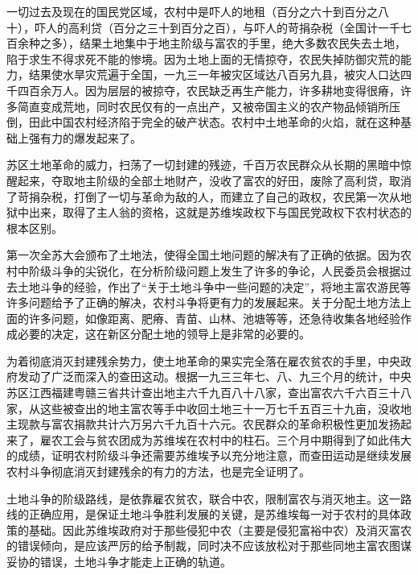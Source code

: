 一切过去及现在的国民党区域，农村中是吓人的地租（百分之六十到百分之八十），吓人的高利贷（百分之三十到百分之百），与吓人的苛捐杂税（全国计一千七百余种之多），结果土地集中于地主阶级与富农的手里，绝大多数农民失去土地，陷于求生不得求死不能的惨境。因为土地上面的无情掠夺，农民失掉防御灾荒的能力，结果使水旱灾荒遍于全国，一九三一年被灾区域达八百另九县，被灾人口达四千四百余万人。因为层层的被掠夺，农民缺乏再生产能力，许多耕地变得很瘠，许多简直变成荒地，同时农民仅有的一点出产，又被帝国主义的农产物品倾销所压倒，田此中国农村经济陷于完全的破产状态。农村中土地革命的火焰，就在这种基础上强有力的爆发起来了。

苏区土地革命的威力，扫荡了一切封建的残迹，千百万农民群众从长期的黑暗中惊醒起来，夺取地主阶级的全部土地财产，没收了富农的好田，废除了高利贷，取消了苛捐杂税，打倒了一切与革命为敌的人，而建立了自己的政权，农民第一次从地狱中出来，取得了主人翁的资格，这就是苏维埃政权下与国民党政权下农村状态的根本区别。

第一次全苏大会颁布了土地法，使得全国土地问题的解决有了正确的依据。因为农村中阶级斗争的尖锐化，在分析阶级问题上发生了许多的争论，人民委员会根据过去土地斗争的经验，作出了“关于土地斗争中一些问题的决定”，将地主富农游民等许多问题给予了正确的解决，农村斗争将更有力的发展起来。关于分配土地方法上面的许多问题，如像距离、肥瘠、青苗、山林、池塘等等，还急待收集各地经验作成必要的决定，这在新区分配土地的领导上是非常的必要的。

为着彻底消灭封建残余势力，使土地革命的果实完全落在雇农贫农的手里，中央政府发动了广泛而深入的查田这动。根据一九三三年七、八、九三个月的统计，中央苏区江西福建粤赣三省共计查出地主六千九百八十八家，查出富农六千六百三十八家，从这些被查出的地主富农等手中收回土地三十一万七千五百三十九亩，没收地主现款与富农捐款共计六万另六千九百十六元。农民群众的革命积极性更加发扬起来了，雇农工会与贫农团成为苏维埃在农村中的柱石。三个月中期得到了如此伟大的成绩，证明农村阶级斗争还需要苏维埃予以充分地注意，而查田运动是继续发展农村斗争彻底消灭封建残余的有力的方法，也是完全证明了。

土地斗争的阶级路线，是依靠雇农贫农，联合中农，限制富农与消灭地主。这一路线的正确应用，是保证土地斗争胜利发展的关键，是苏维埃每一对于农村的具体政策的基础。因此苏维埃政府对于那些侵犯中农（主要是侵犯富裕中农）及消灭富农的错误倾向，是应该严厉的给予制裁，同时决不应该放松对于那些同地主富农图谋妥协的错误，土地斗争才能走上正确的轨道。

